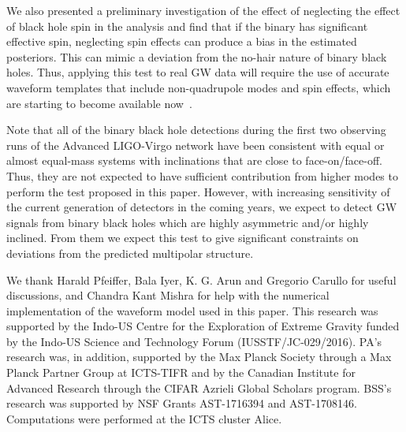\documentclass[prd,preprintnumbers,twocolumn,eqsecnum,floatfix,a4paper,nofootinbib,superscriptaddress]{revtex4}
\begin{document}
We also presented a preliminary investigation of the effect of neglecting the effect of black hole spin in the analysis and find that if the binary has significant effective spin, neglecting spin effects can produce a bias in the estimated posteriors. This can mimic a deviation from the no-hair nature of binary black holes. Thus, applying this test to real GW data will require the use of accurate waveform templates that include non-quadrupole modes and spin effects, which are starting to become available now~\cite{london2018first,cotesta2018enriching}. 

Note that all of the binary black hole detections during the first two observing runs of the Advanced LIGO-Virgo network have been consistent with equal or almost equal-mass systems with inclinations that are close to face-on/face-off. Thus, they are not expected to have sufficient contribution from higher modes to perform the test proposed in this paper. However, with increasing sensitivity of the current generation of detectors in the coming years, we expect to detect GW signals from binary black holes which are highly asymmetric and/or highly inclined. From them we expect this test to give significant constraints on deviations from the predicted multipolar structure. 

\bigskip 
\acknowledgments
We thank Harald Pfeiffer, Bala Iyer, K. G. Arun and Gregorio Carullo for useful discussions, and Chandra Kant Mishra for help with the numerical implementation of the waveform model used in this paper. This research was supported by the Indo-US Centre for the Exploration of Extreme Gravity funded by the Indo-US Science and Technology Forum (IUSSTF/JC-029/2016). PA's research was, in addition, supported by the Max Planck Society through a Max Planck Partner Group at ICTS-TIFR and by the Canadian Institute for Advanced Research through the CIFAR Azrieli Global Scholars program. BSS's research was supported by NSF Grants AST-1716394 and AST-1708146. Computations were performed at the ICTS cluster Alice. 


\end{document}

